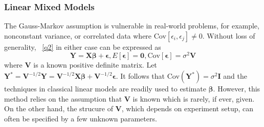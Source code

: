 	\subsubsection{Linear Mixed Models}
	The Gauss-Markov assumption is vulnerable in real-world problems, for example, nonconstant variance, or correlated data where Cov$[\epsilon_i, \epsilon_j]\neq 0$. Without loss of generality, ~\ref{q2} in either case can be expressed as
	\begin{equation}\label{lm}
	\bm Y = \bm {X\beta} + \bm \epsilon,  E[\bm \epsilon] = \bm 0, \text{Cov}[\bm\epsilon] = \sigma^2 \bm V
	\end{equation}
	where $\bm V$ is a known positive definite matrix. Let $\bm Y^{\ast} = \bm V^{-1/2}\bm Y = \bm V^{-1/2}\bm {X\beta} + \bm V^{-1/2}\bm \epsilon$. It follows that Cov$(\bm Y^{\ast})= \sigma^2 \bm I$ and the techniques in classical linear models are readily used to estimate $\bm \beta$. However, this method relies on the assumption that $\bm V$ is known which is rarely, if ever, given. On the other hand, the strucure of $\bm V$, which depends on experiment setup, can often be specified by a few unknown parameters. 
	
